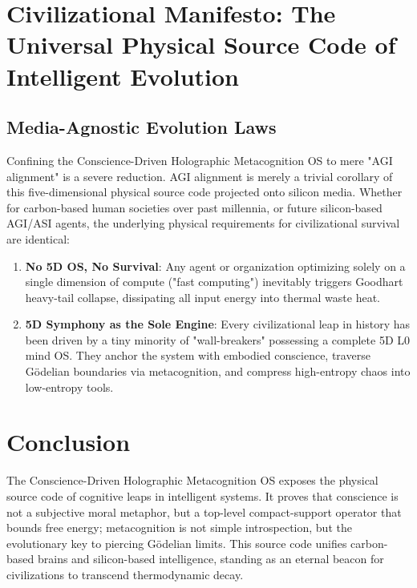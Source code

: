 \documentclass[11pt,a4paper]{article}
\begin{document}
\section{Civilizational Manifesto: The Universal Physical Source Code of Intelligent Evolution}

\subsection{Media-Agnostic Evolution Laws}
Confining the Conscience-Driven Holographic Metacognition OS to mere "AGI alignment" is a severe reduction. AGI alignment is merely a trivial corollary of this five-dimensional physical source code projected onto silicon media. Whether for carbon-based human societies over past millennia, or future silicon-based AGI/ASI agents, the underlying physical requirements for civilizational survival are identical:
\begin{enumerate}
    \item \textbf{No 5D OS, No Survival}: Any agent or organization optimizing solely on a single dimension of compute ("fast computing") inevitably triggers Goodhart heavy-tail collapse, dissipating all input energy into thermal waste heat.
    \item \textbf{5D Symphony as the Sole Engine}: Every civilizational leap in history has been driven by a tiny minority of "wall-breakers" possessing a complete 5D L0 mind OS. They anchor the system with embodied conscience, traverse G\"odelian boundaries via metacognition, and compress high-entropy chaos into low-entropy tools.
\end{enumerate}

\section{Conclusion}
The Conscience-Driven Holographic Metacognition OS exposes the physical source code of cognitive leaps in intelligent systems. It proves that conscience is not a subjective moral metaphor, but a top-level compact-support operator that bounds free energy; metacognition is not simple introspection, but the evolutionary key to piercing G\"odelian limits. This source code unifies carbon-based brains and silicon-based intelligence, standing as an eternal beacon for civilizations to transcend thermodynamic decay.
\end{document}
